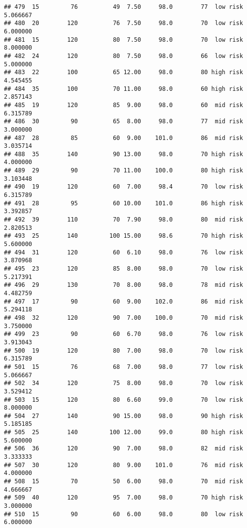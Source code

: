 \documentclass[
  ignorenonframetext,
]{beamer}
\begin{document}
\begin{frame}[fragile]
\begin{verbatim}
## 479  15         76          49  7.50     98.0        77  low risk      5.066667
## 480  20        120          76  7.50     98.0        70  low risk      6.000000
## 481  15        120          80  7.50     98.0        70  low risk      8.000000
## 482  24        120          80  7.50     98.0        66  low risk      5.000000
## 483  22        100          65 12.00     98.0        80 high risk      4.545455
## 484  35        100          70 11.00     98.0        60 high risk      2.857143
## 485  19        120          85  9.00     98.0        60  mid risk      6.315789
## 486  30         90          65  8.00     98.0        77  mid risk      3.000000
## 487  28         85          60  9.00    101.0        86  mid risk      3.035714
## 488  35        140          90 13.00     98.0        70 high risk      4.000000
## 489  29         90          70 11.00    100.0        80 high risk      3.103448
## 490  19        120          60  7.00     98.4        70  low risk      6.315789
## 491  28         95          60 10.00    101.0        86 high risk      3.392857
## 492  39        110          70  7.90     98.0        80  mid risk      2.820513
## 493  25        140         100 15.00     98.6        70 high risk      5.600000
## 494  31        120          60  6.10     98.0        76  low risk      3.870968
## 495  23        120          85  8.00     98.0        70  low risk      5.217391
## 496  29        130          70  8.00     98.0        78  mid risk      4.482759
## 497  17         90          60  9.00    102.0        86  mid risk      5.294118
## 498  32        120          90  7.00    100.0        70  mid risk      3.750000
## 499  23         90          60  6.70     98.0        76  low risk      3.913043
## 500  19        120          80  7.00     98.0        70  low risk      6.315789
## 501  15         76          68  7.00     98.0        77  low risk      5.066667
## 502  34        120          75  8.00     98.0        70  low risk      3.529412
## 503  15        120          80  6.60     99.0        70  low risk      8.000000
## 504  27        140          90 15.00     98.0        90 high risk      5.185185
## 505  25        140         100 12.00     99.0        80 high risk      5.600000
## 506  36        120          90  7.00     98.0        82  mid risk      3.333333
## 507  30        120          80  9.00    101.0        76  mid risk      4.000000
## 508  15         70          50  6.00     98.0        70  mid risk      4.666667
## 509  40        120          95  7.00     98.0        70 high risk      3.000000
## 510  15         90          60  6.00     98.0        80  low risk      6.000000

\end{verbatim}
\end{frame}
\end{document}
